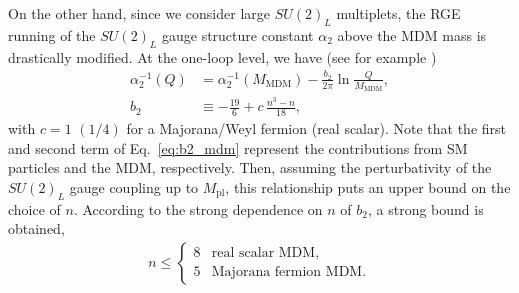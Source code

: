 \documentclass[12pt,twoside,book]{article}
\begin{document}
On the other hand, since we consider large $SU(2)_L$ multiplets, the RGE running of the $SU(2)_L$ gauge structure constant $\alpha_2$ above the MDM mass is drastically modified.
At the one-loop level, we have (see for example \cite{Machacek:1983tz})
\begin{align}
  \alpha_2^{-1} (Q) &= \alpha_2^{-1} (M_{\mathrm{MDM}}) - \frac{b_2}{2\pi} \ln \frac{Q}{M_{\mathrm{MDM}}},\\
  b_2 &\equiv -\frac{19}{6} + c\, \frac{n^3 - n}{18},
  \label{eq:b2_mdm}
\end{align}
with $c = 1$ $(1/4)$ for a Majorana/Weyl fermion (real scalar).
Note that the first and second term of Eq.~\eqref{eq:b2_mdm} represent the contributions from SM particles and the MDM, respectively.
Then, assuming the perturbativity of the $SU(2)_L$ gauge coupling up to $M_{\mathrm{pl}}$, this relationship puts an upper bound on the choice of $n$.
According to the strong dependence on $n$ of $b_2$, a strong bound is obtained,
\begin{align}
  n \leq
  \begin{cases}
    8 & \text{real scalar MDM},\\
    5 & \text{Majorana fermion MDM}.
  \end{cases}
\end{align}
\end{document}
